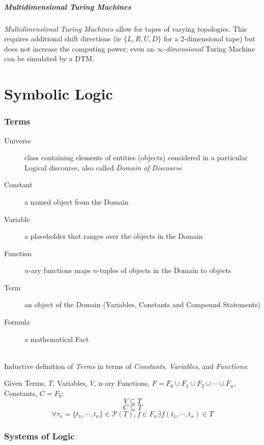 \documentclass{article}
\begin{document}
\subsubsection{Multidimensional Turing Machines}
\emph{Multidimensional Turing Machines} allow for tapes of varying
topologies. This requires additional shift directions (ie $\{L, R, U,
D\}$ for a 2-dimensional tape) but does not increase the computing
power; even an $\infty$-\emph{dimensional} Turing Machine can be
simulated by a DTM.

\part{Symbolic Logic}

\section{Terms}\label{sec:terms}

\begin{description}
\item[Universe] class containing elements of entities (objects)
  considered in a particular Logical discourse, also called
  \emph{Domain of Discourse}
\item[Constant] a named object from the Domain
\item[Variable] a placeholder that ranges over the objects in the
  Domain
\item[Function] $n$-ary functions maps $n$-tuples of objects in the
  Domain to objects
\item[Term] an object of the Domain (Variables, Constants and Compound
  Statements)
\item[Formula] a mathematical Fact
\end{description}
\hfill \\
Inductive definition of \emph{Terms} in terms of \emph{Constants},
\emph{Variables}, and \emph{Functions}:

Given Terms, $T$, Variables, $V$, n-ary Functions, $F = F_0 \cup F_1
\cup F_2 \cup \cdots \cup F_n$, Constants, $C = F_0$:
\[
    V \subseteq T
\]\[
    C \subseteq T
\]\[
    \forall \tau_n=\{t_1,\cdots,t_n\} \in \mathcal{P}(T), f \in F_n
    \exists f(t_1,\cdots,t_n) \in T
\]

\section{Systems of Logic}
\end{document}
